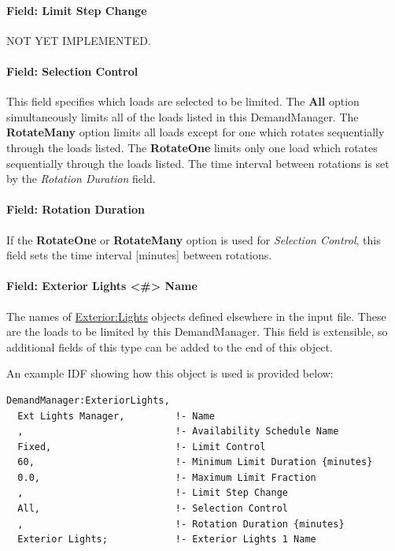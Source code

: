 \paragraph{Field: Limit Step Change}\label{field-limit-step-change}

NOT YET IMPLEMENTED.

\paragraph{Field: Selection Control}\label{field-selection-control}

This field specifies which loads are selected to be limited. The \textbf{All} option simultaneously limits all of the loads listed in this DemandManager. The \textbf{RotateMany} option limits all loads except for one which rotates sequentially through the loads listed. The \textbf{RotateOne} limits only one load which rotates sequentially through the loads listed. The time interval between rotations is set by the \emph{Rotation Duration} field.

\paragraph{Field: Rotation Duration}\label{field-rotation-duration}

If the \textbf{RotateOne} or \textbf{RotateMany} option is used for \emph{Selection Control}, this field sets the time interval {[}minutes{]} between rotations.

\paragraph{Field: Exterior Lights \textless{}\#\textgreater{} Name}\label{field-exterior-lights-1-10-name}

The names of \hyperref[exteriorlights]{Exterior:Lights} objects defined elsewhere in the input file. These are the loads to be limited by this DemandManager.  This field is extensible, so additional fields of this type can be added to the end of this object.

An example IDF showing how this object is used is provided below:

\begin{lstlisting}
DemandManager:ExteriorLights,
  Ext Lights Manager,         !- Name
  ,                           !- Availability Schedule Name
  Fixed,                      !- Limit Control
  60,                         !- Minimum Limit Duration {minutes}
  0.0,                        !- Maximum Limit Fraction
  ,                           !- Limit Step Change
  All,                        !- Selection Control
  ,                           !- Rotation Duration {minutes}
  Exterior Lights;            !- Exterior Lights 1 Name
\end{lstlisting}

